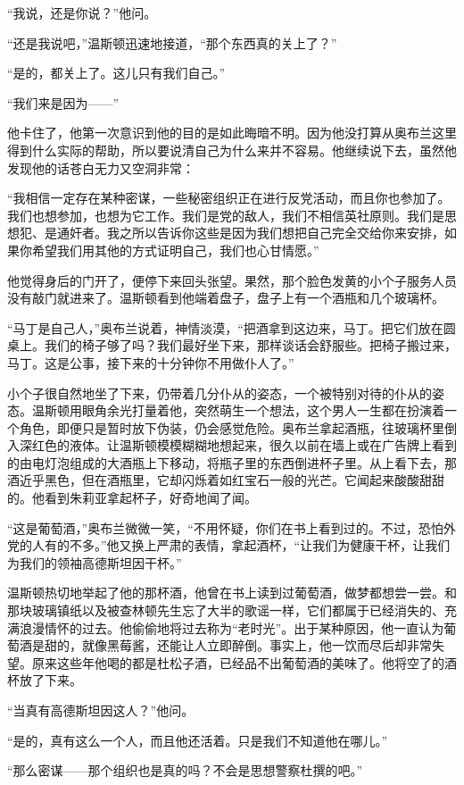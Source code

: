 ``我说，还是你说？''他问。

``还是我说吧，''温斯顿迅速地接道，``那个东西真的关上了？''

``是的，都关上了。这儿只有我们自己。''

``我们来是因为——''

他卡住了，他第一次意识到他的目的是如此晦暗不明。因为他没打算从奥布兰这里得到什么实际的帮助，所以要说清自己为什么来并不容易。他继续说下去，虽然他发现他的话苍白无力又空洞非常：

``我相信一定存在某种密谋，一些秘密组织正在进行反党活动，而且你也参加了。我们也想参加，也想为它工作。我们是党的敌人，我们不相信英社原则。我们是思想犯、是通奸者。我之所以告诉你这些是因为我们想把自己完全交给你来安排，如果你希望我们用其他的方式证明自己，我们也心甘情愿。''

他觉得身后的门开了，便停下来回头张望。果然，那个脸色发黄的小个子服务人员没有敲门就进来了。温斯顿看到他端着盘子，盘子上有一个酒瓶和几个玻璃杯。

``马丁是自己人，''奥布兰说着，神情淡漠，``把酒拿到这边来，马丁。把它们放在圆桌上。我们的椅子够了吗？我们最好坐下来，那样谈话会舒服些。把椅子搬过来，马丁。这是公事，接下来的十分钟你不用做仆人了。''

小个子很自然地坐了下来，仍带着几分仆从的姿态，一个被特别对待的仆从的姿态。温斯顿用眼角余光打量着他，突然萌生一个想法，这个男人一生都在扮演着一个角色，即便只是暂时放下伪装，仍会感觉危险。奥布兰拿起酒瓶，往玻璃杯里倒入深红色的液体。让温斯顿模模糊糊地想起来，很久以前在墙上或在广告牌上看到的由电灯泡组成的大酒瓶上下移动，将瓶子里的东西倒进杯子里。从上看下去，那酒近乎黑色，但在酒瓶里，它却闪烁着如红宝石一般的光芒。它闻起来酸酸甜甜的。他看到朱莉亚拿起杯子，好奇地闻了闻。

``这是葡萄酒，''奥布兰微微一笑，``不用怀疑，你们在书上看到过的。不过，恐怕外党的人有的不多。''他又换上严肃的表情，拿起酒杯，``让我们为健康干杯，让我们为我们的领袖高德斯坦因干杯。''

温斯顿热切地举起了他的那杯酒，他曾在书上读到过葡萄酒，做梦都想尝一尝。和那块玻璃镇纸以及被查林顿先生忘了大半的歌谣一样，它们都属于已经消失的、充满浪漫情怀的过去。他偷偷地将过去称为``老时光''。出于某种原因，他一直认为葡萄酒是甜的，就像黑莓酱，还能让人立即醉倒。事实上，他一饮而尽后却非常失望。原来这些年他喝的都是杜松子酒，已经品不出葡萄酒的美味了。他将空了的酒杯放了下来。

``当真有高德斯坦因这人？''他问。

``是的，真有这么一个人，而且他还活着。只是我们不知道他在哪儿。''

``那么密谋——那个组织也是真的吗？不会是思想警察杜撰的吧。''

